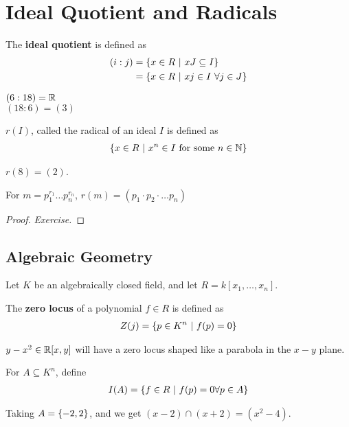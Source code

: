 \documentclass[12pt, twosided]{article}
\begin{document}
\section{Ideal Quotient and Radicals}

\begin{df}
  The \textbf{ideal quotient} is defined as
  \begin{align*}
    (i:j) &= \left\{ x \in R \ \middle\vert\  xJ \subseteq I \right\} \\
          &= \left\{ x \in R \ \middle\vert\  xj \in I\ \forall j \in J \right\}
  \end{align*}
\end{df}
\begin{exa}
  \((6:18) = \mathbb{R}\)\\
  \((18:6) = (3)\)
\end{exa}
\begin{df}
  \(r(I)\), called the radical of an ideal \(I\) is defined as
  \begin{align*}
    \left\{ x \in R \ \middle\vert\  x^n \in I \text{ for some } n \in \mathbb{N} \right\}
  \end{align*}
\end{df}

\begin{exa}
  \(r(8) = (2)\).
\end{exa}

\begin{prop}\label{Prob2.3}
  For \(m = p_1^{r_1}\ldots p_n^{r_n}\), \(r(m) = (p_1 \cdot p_2 \cdot \ldots p_n)\)
\end{prop}
\begin{proof}
  {\color{red} \textit{Exercise.}}
\end{proof}
\subsection{Algebraic Geometry}

Let \(K\) be an algebraically closed field, and let \(R = k[x_1, \ldots, x_n]\).

\begin{df}
  The \textbf{zero locus} of a polynomial \(f \in R\) is defined as
  \begin{align*}
    Z(j) = \left\{ p \in K^n \ \middle\vert\  f(p) = 0 \right\}
  \end{align*}
\end{df}

\begin{exa}
  \(y - x^2 \in \mathbb{R}[x, y]\) will have a zero locus shaped like a parabola in the \(x-y\) plane.
\end{exa}
\begin{df}
  For \(A \subseteq K^n\), define
  \begin{align*}
    I(A) = \left\{ f \in R \ \middle\vert\  f(p) = 0 \forall p \in A \right\}
  \end{align*}
\end{df}
\begin{exa}
  Taking \(A = \left\{ -2, 2 \right\}\), and we get \((x-2) \cap (x + 2) = (x^2 - 4)\).
\end{exa}
\end{document}
